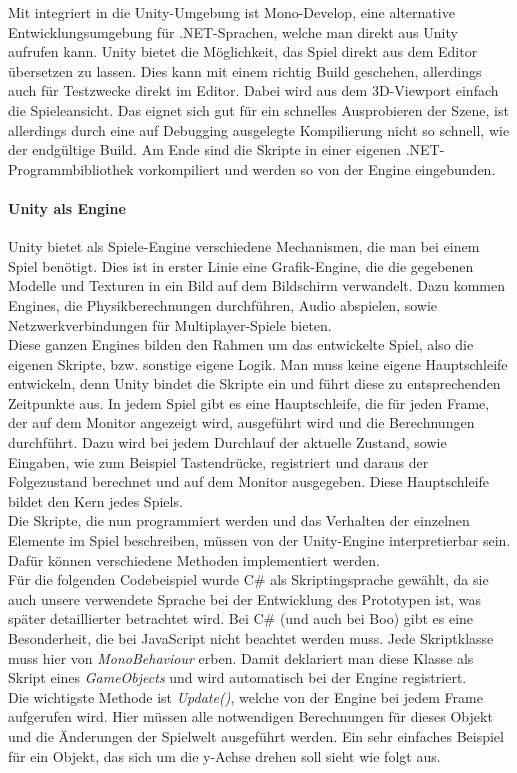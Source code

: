 Mit integriert in die Unity-Umgebung ist Mono-Develop, eine alternative Entwicklungsumgebung für .NET-Sprachen, welche man direkt aus Unity aufrufen kann. Unity bietet die Möglichkeit, das Spiel direkt aus dem Editor übersetzen zu lassen. Dies kann mit einem richtig Build geschehen, allerdings auch für Testzwecke direkt im Editor. Dabei wird aus dem 3D-Viewport einfach die Spieleansicht. Das eignet sich gut für ein schnelles Ausprobieren der Szene, ist allerdings durch eine auf Debugging ausgelegte Kompilierung nicht so schnell, wie der endgültige Build. Am Ende sind die Skripte in einer eigenen .NET-Programmbibliothek vorkompiliert und werden so von der Engine eingebunden.

\paragraph{Unity als Engine} Unity bietet als Spiele-Engine verschiedene Mechanismen, die man bei einem Spiel benötigt. Dies ist in erster Linie eine Grafik-Engine, die die gegebenen Modelle und Texturen in ein Bild auf dem Bildschirm verwandelt. Dazu kommen Engines, die Physikberechnungen durchführen, Audio abspielen, sowie Netzwerkverbindungen für Multiplayer-Spiele bieten.\\
Diese ganzen Engines bilden den Rahmen um das entwickelte Spiel, also die eigenen Skripte, bzw. sonstige eigene Logik. Man muss keine eigene Hauptschleife entwickeln, denn Unity bindet die Skripte ein und führt diese zu entsprechenden Zeitpunkte aus. In jedem Spiel gibt es eine Hauptschleife, die für jeden Frame, der auf dem Monitor angezeigt wird, ausgeführt wird und die Berechnungen durchführt. Dazu wird bei jedem Durchlauf der aktuelle Zustand, sowie Eingaben, wie zum Beispiel Tastendrücke, registriert und daraus der Folgezustand berechnet und auf dem Monitor ausgegeben. Diese Hauptschleife bildet den Kern jedes Spiels.\\
Die Skripte, die nun programmiert werden und das Verhalten der einzelnen Elemente im Spiel beschreiben, müssen von der Unity-Engine interpretierbar sein. Dafür können verschiedene Methoden implementiert werden. \\
Für die folgenden Codebeispiel wurde C\# als Skriptingsprache gewählt, da sie auch unsere verwendete Sprache bei der Entwicklung des Prototypen ist, was später detaillierter betrachtet wird. Bei C\# (und auch bei Boo) gibt es eine Besonderheit, die bei JavaScript nicht beachtet werden muss. Jede Skriptklasse muss hier von \textit{MonoBehaviour} erben. Damit deklariert man diese Klasse als Skript eines \textit{GameObjects} und wird automatisch bei der Engine registriert.\\
Die wichtigste Methode ist \textit{Update()}, welche von der Engine bei jedem Frame aufgerufen wird. Hier müssen alle notwendigen Berechnungen für dieses Objekt und die Änderungen der Spielwelt ausgeführt werden.
Ein sehr einfaches Beispiel für ein Objekt, das sich um die y-Achse drehen soll sieht wie folgt aus.\\

